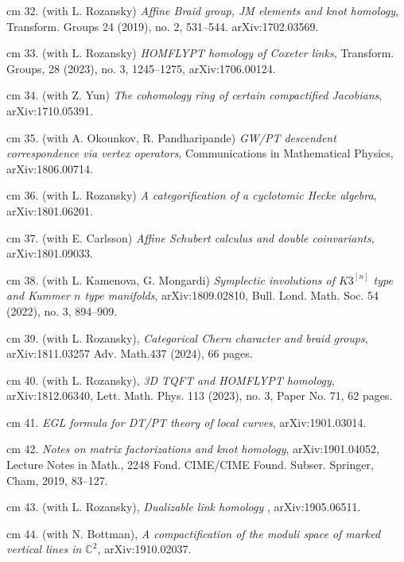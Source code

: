 \documentclass[11pt]{amsart}
\theoremstyle{plain}
\theoremstyle{definition}
\theoremstyle{remark}
\begin{document}
\noindent{} cm 32. (with L. Rozansky) {\it Affine Braid group, JM elements and knot homology},
Transform. Groups 24 (2019), no. 2, 531--544. arXiv:1702.03569.


\noindent{} cm 33. (with L. Rozansky) {\it HOMFLYPT homology of Coxeter links}, Transform. Groups, 28 (2023), no. 3, 1245--1275,
arXiv:1706.00124.




\noindent{} cm 34. (with  Z. Yun) {\it The cohomology ring of certain compactified Jacobians},  arXiv:1710.05391. 


\noindent{} cm 35. (with A. Okounkov, R. Pandharipande) {\it  GW/PT descendent correspondence via vertex operators}, Communications in Mathematical Physics, arXiv:1806.00714.



\noindent{} cm 36. (with L. Rozansky)
{\it A categorification of a cyclotomic Hecke algebra}, arXiv:1801.06201.

\noindent{} cm 37. (with E. Carlsson)
{\it Affine Schubert calculus and double coinvariants}, arXiv:1801.09033.

\noindent{} cm 38. (with L. Kamenova, G. Mongardi) {\it Symplectic involutions of \(K3^{[n]}\) type and Kummer \(n\)
  type manifolds}, arXiv:1809.02810, Bull. Lond. Math. Soc. 54 (2022), no. 3, 894--909.

\noindent{} cm 39. (with L. Rozansky), {\it Categorical Chern character and braid groups},   arXiv:1811.03257 Adv. Math.437 (2024), 66 pages.

\noindent{} cm 40. (with L. Rozansky), {\it 3D TQFT and HOMFLYPT homology},  arXiv:1812.06340, Lett. Math. Phys. 113 (2023), no. 3, Paper No. 71, 62 pages.

\noindent{} cm 41. {\it EGL formula for DT/PT theory of local curves}, arXiv:1901.03014.

\noindent{} cm 42. {\it Notes on matrix factorizations and knot homology}, arXiv:1901.04052, Lecture Notes in Math., 2248
Fond. CIME/CIME Found. Subser.
Springer, Cham, 2019, 83--127.

\noindent{} cm 43. (with L. Rozansky), {\it Dualizable link homology }, arXiv:1905.06511.

\noindent{} cm 44. (with N. Bottman), {\it 
A compactification of the moduli space of marked vertical lines in $\mathbb{C}^2$, } arXiv:1910.02037.
\end{document}
